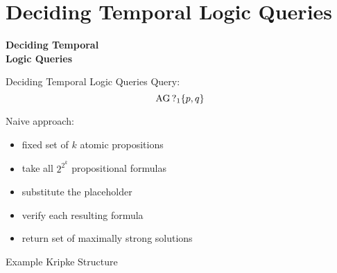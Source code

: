 \section{Deciding Temporal Logic Queries}

\begin{frame}[plain]
  \vfill

  \begin{center}
    \Huge \color{oceangreen} \bfseries 
    Deciding Temporal\\ Logic Queries
  \end{center}

  \vfill
\end{frame}

\begin{frame}{Deciding Temporal Logic Queries}
  Query:
  \[ \operatorname{AG} \operatorname{?}_1 \{p,q\} \]
  
  Naive approach:
  \begin{itemize}
    \item fixed set of $k$ atomic propositions
    \item take all $2^{2^k}$ propositional formulas
    \item substitute the placeholder
    \item verify each resulting formula
    \item return set of maximally strong solutions
  \end{itemize}
\end{frame}


\begin{frame}[plain]{Example Kripke Structure}
  \vfill

  \begin{center}
  \end{center}

  \vfill
\end{frame}

